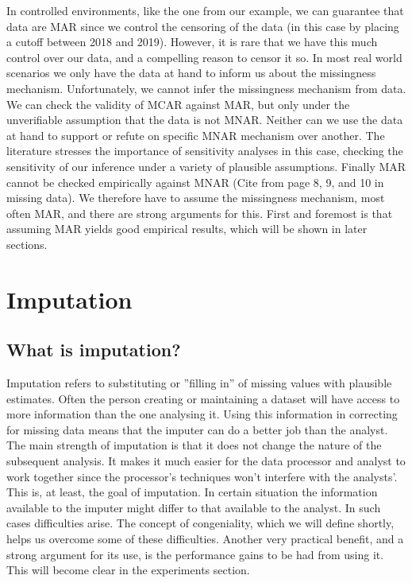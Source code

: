 \documentclass{article}
\begin{document}
	In controlled environments, like the one from our example, we can guarantee that data are MAR since we control the censoring of the data (in this case by placing a cutoff between 2018 and 2019). However, it is rare that we have this much control over our data, and a compelling reason to censor it so. In most real world scenarios we only have the data at hand to inform us about the missingness mechanism. Unfortunately, we cannot infer the missingness mechanism from data.  We can check the validity of MCAR against MAR, but only under the unverifiable assumption that the data is not MNAR. Neither can we use the data at hand to support or refute on specific MNAR mechanism over another. The literature stresses the importance of sensitivity analyses in this case, checking the sensitivity of our inference under a variety of plausible assumptions. Finally MAR cannot be checked empirically against MNAR  (Cite from page 8, 9, and 10 in missing data). We therefore have to assume the missingness mechanism, most often MAR, and there are strong arguments for this. First and foremost is that assuming MAR yields good empirical results, which will be shown in later sections. %
	
	\section{Imputation}
	
	\subsection{What is imputation?}
	Imputation refers to substituting or ''filling in'' of missing values with plausible estimates. Often the person creating or maintaining a dataset will have access to more information than the one analysing it. Using this information in correcting for missing data means that the imputer can do a better job than the analyst. The main strength of imputation is that it does not change the nature of the subsequent analysis. It makes it much easier for the data processor and analyst to work together since the processor's techniques won't interfere with the analysts'. This is, at least, the goal of imputation. In certain situation the information available to the imputer might differ to that available to the analyst. In such cases difficulties arise. The concept of congeniality, which we will define shortly, helps us overcome some of these difficulties. Another very practical benefit, and a strong argument for its use, is the performance gains to be had from using it. This will become clear in the experiments section.
	
\end{document}
